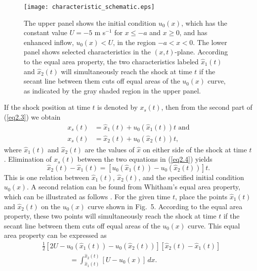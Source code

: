 \documentclass[10pt]{article}
\begin{document}
\begin{figure}[!t]             %
\centerline{\texttt{[image: characteristic\_schematic.eps]}}
\caption{The upper panel shows the initial condition $u_0(x)$, which
has the constant value $U=-5$ m s$^{-1}$ for $x\leq-a$ and $x\geq0$, and
has enhanced inflow, $u_0(x)<U$, in the region $-a<x<0$. The lower
panel shows selected characteristics in the $(x,t)$-plane. According
to the equal area property, the two characteristics labeled $\hat{x}_1(t)$
and $\hat{x}_2(t)$ will simultaneously reach the shock at time $t$ if the
secant line between them cuts off equal areas of the $u_0(x)$ curve,
as indicated by the gray shaded region in the upper panel.}
\end{figure}


    If the shock position at time $t$ is denoted by $x_s(t)$, then from
the second part of (\ref{eq2.3}) we obtain
\begin{equation}                                 %
  \begin{split}
     x_s(t) &= \hat{x}_1(t) + u_0(\hat{x}_1(t)) t \,\,\text{and}  \\
     x_s(t) &= \hat{x}_2(t) + u_0(\hat{x}_2(t)) t,
  \end{split}
\label{eq2.4}
\end{equation}
where $\hat{x}_1(t)$ and $\hat{x}_2(t)$ are the values of $\hat{x}$ on
either side of the shock at time $t$.  Elimination of $x_s(t)$ between
the two equations in (\ref{eq2.4}) yields
\begin{equation}                                 %
        \hat{x}_2(t) - \hat{x}_1(t)
      = \left[u_0(\hat{x}_1(t)) - u_0(\hat{x}_2(t))\right]t.
\label{eq2.5}
\end{equation}
This is one relation between $\hat{x}_1(t)$, $\hat{x}_2(t)$, and the
specified initial condition $u_0(x)$. A second relation can be found
from Whitham's equal area property, which can be illustrated as
follows \citep{whitham74}. For the given
time $t$, place the points $\hat{x}_1(t)$ and $\hat{x}_2(t)$ on the
$u_0(x)$ curve shown in Fig.~5. According to the equal area property,
these two points will simultaneously reach the shock at time $t$ if the
secant line between them cuts off equal areas of the $u_0(x)$ curve.
This equal area property can be expressed as
\begin{equation}                                 %
  \begin{split}
     &\tfrac{1}{2}\left[2U - u_0(\hat{x}_1(t)) - u_0(\hat{x}_2(t))\right]
                 \left[\hat{x}_2(t) - \hat{x}_1(t)\right]   \\
     &\qquad\qquad = \int_{\hat{x}_1(t)}^{\hat{x}_2(t)} [U - u_0(x)]\,dx.
  \end{split}
\label{eq2.6}
\end{equation}
\end{document}
